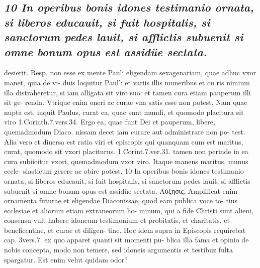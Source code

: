 \documentclass{article}
\begin{document}
\begin{pages}
\subsection*{\textit{10 In operibus bonis idones testimanio ornata, si liberos educauit, si fuit hospitalis, si sanctorum pedes lauit, si afflictis subuenit si omne bonum opus est assidüe sectata.}}desierit. Resp. non esse ex mente Pauli eligendam sexagenariam, quae adhuc vxor manet, quia de vi- duis loquitur Paul': et variis illis muneribus et cu ris nimium illa distraheretur, si iam alligata sit viro suo: et tamen cura etiam pauperum illi sit ge- renda. Vtrique enim oneri ac curae vna satis esse non potest. Nam quae nupta est, inquit Paulus, curat ea, quae sunt mundi, et quomodo placitura sit viro 1.Corinth.7.vers.34. Ergo ea, quae funt Dei et pauperum, libere, quemadmodum Diaco. nissam decet iam curare aut administrare non po- test. Alia vero et diuersa est ratio viri et episcopis qui quanquam cum est maritus, curat, quomodo sit vxori placiturus. 1.Corint.7.ver.31. tamen non perinde in ea cura subiicitur vxori, quemadmodum vxor viro. Itaque manens maritus, munus eccle- siasticum gerere ac obire potest. 10 In operibus bonis idones testimanio ornata, si liberos educauit, si fuit hospitalis, si sanctorum pedes lauit, si afflictis subuenit si omne bonum opus est assidüe sectata. Αύξησις. Amplificat enim ornamenta futurae et eligendae Diaconissae, quod eam publica voce to- tius ecclesiae et aliorum etiam extraneorum ho- minum, qui a fide Christi sunt alieni, consensu vult habere idoneum testimonium et probitatis, et charitatis, et beneficentiae, et curae et diligen- tiae. Hoc idem supra in Episcopis requirebat cap. 3vers.7. ex quo apparet quanti sit momenti pu- blica illa fama et opinio de nobis concepta, modo non temere, sed idoneis argumentis et testibuz fulta spargatur. Est enim velut quidam odor?  \pend

\end{pages}
\end{document}
